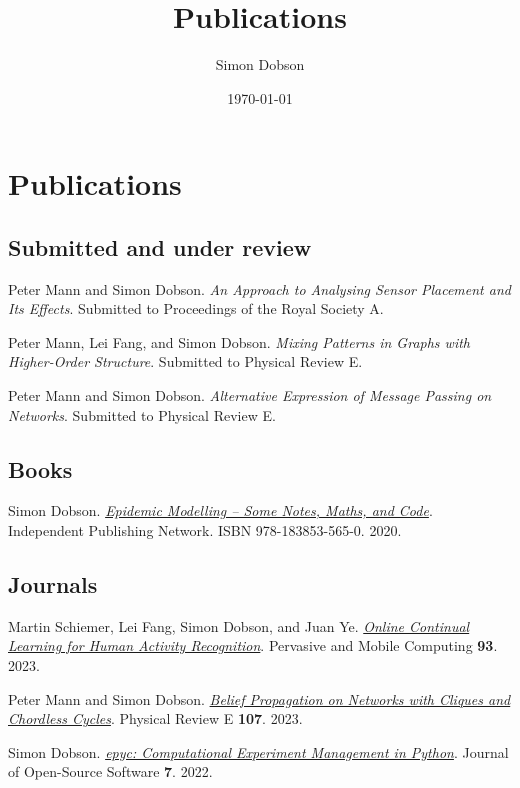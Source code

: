 \documentclass[11pt]{article}
\author{Simon Dobson}
\date{\today}
\title{Publications}
\begin{document}
\maketitle

\section{Publications}
\label{sec:org68fc5ce}

\subsection{Submitted and under review}
\label{sec:org4e0c326}

\label{org84318b7}Peter Mann and Simon Dobson.  \emph{An Approach to Analysing Sensor Placement and Its Effects}. Submitted to Proceedings of the Royal Society A.

\label{org56231d2}Peter Mann, Lei Fang, and Simon Dobson.  \emph{Mixing Patterns in Graphs with Higher-Order Structure}. Submitted to Physical Review E.

\label{orgfbe0d76}Peter Mann and Simon Dobson.  \emph{Alternative Expression of Message Passing on Networks}. Submitted to Physical Review E.

\subsection{Books}
\label{sec:org9a08bc3}

\label{orge65f621}Simon Dobson.  \emph{\href{https://simondobson.org/introduction-to-epidemics/}{Epidemic Modelling – Some Notes, Maths, and Code}}. Independent Publishing Network. ISBN 978-183853-565-0. 2020.

\subsection{Journals}
\label{sec:org4e17577}

\label{org7450fad}Martin Schiemer, Lei Fang, Simon Dobson, and Juan Ye.  \emph{\href{https://doi.org/10.1016/j.pmcj.2023.101817}{Online Continual Learning for Human Activity Recognition}}. Pervasive and Mobile Computing \textbf{93}. 2023.

\label{orgae9f508}Peter Mann and Simon Dobson.  \emph{\href{https://doi.org/10.1103/PhysRevE.107.054303}{Belief Propagation on Networks with Cliques and Chordless Cycles}}. Physical Review E \textbf{107}. 2023.

\label{org24964b3}Simon Dobson.  \emph{\href{https://doi.org/10.21105/joss.03764}{epyc: Computational Experiment Management in Python}}. Journal of Open-Source Software \textbf{7}. 2022.
\end{document}

